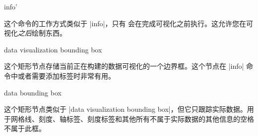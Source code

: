 \begin{datavisualizationoperation}{info'}{} %

    这个命令的工作方式类似于 |info|，只有  会在完成可视化之前执行。这允许您在可视化\emph{之后}绘制东西。
\begin{codeexample}[preamble={\usetikzlibrary{datavisualization.formats.functions}}]
\end{codeexample}
\end{datavisualizationoperation}

\label{section-dv-bounding-box}%
\begin{predefinednode}{data visualization bounding box}

    这个矩形节点存储当前正在构建的数据可视化的一个边界框。这个节点在 |info| 命令中或者需要添加标签时非常有用。
\end{predefinednode}

\begin{predefinednode}{data bounding box}

    这个矩形节点类似于 |data visualization bounding box|，但它只跟踪实际数据。用于网格线、刻度、轴标签、刻度标签和其他所有不属于实际数据的其他信息的空格不属于此框。
\end{predefinednode}


